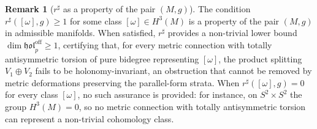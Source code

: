 \documentclass[11pt,reqno]{amsart}
\theoremstyle{plain}
\theoremstyle{definition}
\newtheorem{remark}[theorem]{Remark}
\numberwithin{equation}{section}
\begin{document}
\begin{remark} [$r^\sharp$ as a property of the pair $(M,g)$]
\label{rem:property}
The condition $r^\sharp([\omega], g) \geq 1$ for some class $[\omega] \in H^3(M)$ is a property of the pair $(M,g)$ in admissible manifolds. When satisfied, $r^\sharp$ provides a non-trivial lower bound $\dim\mathfrak{hol}^{\mathrm{off}}_p \geq 1$, certifying that, for every metric connection with totally antisymmetric torsion of pure bidegree representing $[\omega]$, the product splitting $V_1\oplus V_2$ fails to be holonomy-invariant, an obstruction that cannot be removed by metric deformations preserving the parallel-form strata. When $r^\sharp([\omega], g) = 0$ for every class $[\omega]$, no such assurance is provided: for instance, on $S^2 \times S^2$ the group $H^3(M) = 0$, so no metric connection with totally antisymmetric torsion can represent a non-trivial cohomology class.
\end{remark}
\end{document}
